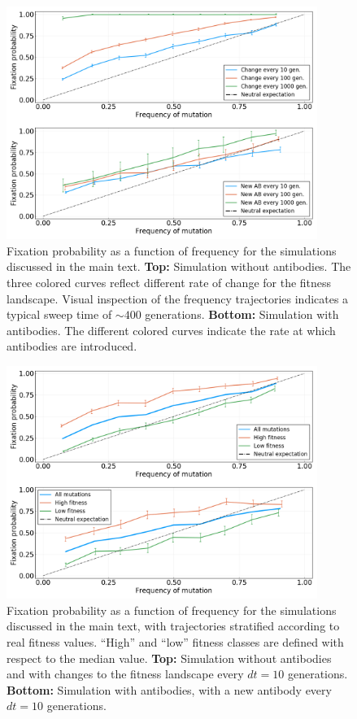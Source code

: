 \documentclass[reprint,amsmath,amssymb,superscriptaddress,showpacs,pre]{revtex4-1}
\begin{document}
	\begin{figure}
		\centering
		\includegraphics[width=0.9\textwidth]{SM_figures/simulation.png}
		\caption{Fixation probability as a function of frequency for the simulations discussed in the main text. \textbf{Top:} Simulation without antibodies. The three colored curves reflect different rate of change for the fitness landscape. Visual inspection of the frequency trajectories indicates a typical sweep time of $\sim400$ generations. \textbf{Bottom:} Simulation with antibodies. The different colored curves indicate the rate at which antibodies are introduced. }
		\label{fig:simulations}
	\end{figure}
	
	\begin{figure}
		\centering
		\includegraphics[width=0.9\textwidth]{SM_figures/simulation_fitness.png}
		\caption{Fixation probability as a function of frequency for the simulations discussed in the main text, with trajectories stratified according to real fitness values. ``High'' and ``low'' fitness classes are defined with respect to the median value. \textbf{Top:} Simulation without antibodies and with changes to the fitness landscape every $dt=10$ generations. \textbf{Bottom:} Simulation with antibodies, with a new antibody every $dt=10$ generations. }
		\label{fig:simulations_fitness}
	\end{figure}



\end{document}
